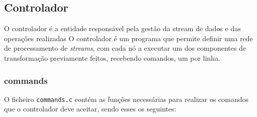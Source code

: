 \documentclass[12pt]{article}
\begin{document}
\subsection{Controlador}
O controlador é a entidade responsável pela gestão da stream de dados e das operações realizadas
O controlador é um programa que permite definir uma rede de processamento de \textit{streams}, com cada nó a executar um dos componentes de transformação previamente feitos, recebendo comandos, um por linha. 

\subsubsection{commands}
O ficheiro \texttt{commands.c} contém as funções necessárias para realizar os comandos que o controlador deve aceitar, sendo esses os seguintes:
\end{document}
